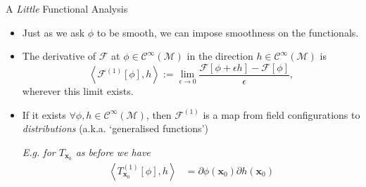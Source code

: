 \documentclass[pdf, fleqn, compress, handout]{beamer}
\newcommand{\mathsterm}[1]{{\itshape\color{dark-teal!80}#1}}
\newcommand{\ourex}[1]{{\itshape\color{viridian!70!black}#1}}
\begin{document}
\begin{frame}{A \textit{Little} Functional Analysis}
	\begin{itemize}
		\item	Just as we ask $\phi$ to be smooth,
				we can impose smoothness on the functionals.
		\item	The derivative of
				$\mathcal{F}$ at $\phi \in \mathcal{C}^\infty(\mathcal{M})$
				in the direction $h    \in \mathcal{C}^\infty(\mathcal{M})$ is
				\begin{equation}
					\left\langle 
						\mathcal{F}^{(1)}[\phi]
							,
						h
					\right\rangle
						:=
						\lim_{\epsilon \to 0}
							\frac{
								\mathcal{F}[\phi + \epsilon h] - \mathcal{F}[\phi]
							}{
								\epsilon
							},
				\end{equation}
				wherever this limit exists.
		\item 	If it exists $\forall \phi, h \in \mathcal{C}^\infty(\mathcal{M})$,
				then $\mathcal{F}^{(1)}$ is a map from
				field configurations to \mathsterm{distributions}
				(a.k.a. `generalised functions')
		
				\ourex{
					E.g. for $T_{\mathbf{x}_0}$ as before we have
					\begin{align}
						\left\langle
							T_{\mathbf{x}_0}^{(1)}[\phi],
							h
						\right\rangle
							&=
						\partial \phi(\mathbf{x}_0)
						\partial   h (\mathbf{x}_0)
					\end{align}
					}
	\end{itemize}
\end{frame}
\end{document}
